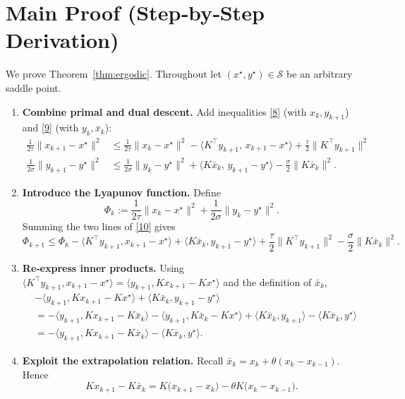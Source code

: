 \documentclass[11pt]{article}
\begin{document}
\section*{Main Proof (Step‑by‑Step Derivation)}
We prove Theorem~\ref{thm:ergodic}.  Throughout let $(x^{\star},y^{\star})\in\mathcal{S}$ be an arbitrary saddle point.

\begin{enumerate}[label=[Step \arabic*]]
\item \textbf{Combine primal and dual descent.}  
Add inequalities \eqref{8} (with $x_{k},y_{k+1}$) and \eqref{9} (with $y_{k},\bar{x}_{k}$):
\[
\begin{aligned}
\frac{1}{2\tau}\|x_{k+1}-x^{\star}\|^{2}
&\le \frac{1}{2\tau}\|x_{k}-x^{\star}\|^{2}
      -\langle K^{\top}y_{k+1},\,x_{k+1}-x^{\star}\rangle
      +\frac{\tau}{2}\|K^{\top}y_{k+1}\|^{2}\\[4pt]
\frac{1}{2\sigma}\|y_{k+1}-y^{\star}\|^{2}
&\le \frac{1}{2\sigma}\|y_{k}-y^{\star}\|^{2}
      +\langle K\bar{x}_{k},\,y_{k+1}-y^{\star}\rangle
      -\frac{\sigma}{2}\|K\bar{x}_{k}\|^{2}.
\end{aligned}
\tag{10}
\]

\item \textbf{Introduce the Lyapunov function.}  
Define
\[
\Phi_{k}:=\frac{1}{2\tau}\|x_{k}-x^{\star}\|^{2}
        +\frac{1}{2\sigma}\|y_{k}-y^{\star}\|^{2}.
\tag{11}
\]
Summing the two lines of \eqref{10} gives
\[
\Phi_{k+1}\le \Phi_{k}
   -\langle K^{\top}y_{k+1},x_{k+1}-x^{\star}\rangle
   +\langle K\bar{x}_{k},y_{k+1}-y^{\star}\rangle
   +\frac{\tau}{2}\|K^{\top}y_{k+1}\|^{2}
   -\frac{\sigma}{2}\|K\bar{x}_{k}\|^{2}.
\tag{12}
\]

\item \textbf{Re‑express inner products.}  
Using $\langle K^{\top}y_{k+1},x_{k+1}-x^{\star}\rangle
      =\langle y_{k+1},Kx_{k+1}-Kx^{\star}\rangle$ and the definition of $\bar{x}_{k}$,
\[
\begin{aligned}
&-\langle y_{k+1},Kx_{k+1}-Kx^{\star}\rangle
   +\langle K\bar{x}_{k},y_{k+1}-y^{\star}\rangle\\
&= -\langle y_{k+1},Kx_{k+1}-K\bar{x}_{k}\rangle
   -\langle y_{k+1},K\bar{x}_{k}-Kx^{\star}\rangle
   +\langle K\bar{x}_{k},y_{k+1}\rangle
   -\langle K\bar{x}_{k},y^{\star}\rangle\\
&= -\langle y_{k+1},Kx_{k+1}-K\bar{x}_{k}\rangle
   -\langle K\bar{x}_{k},y^{\star}\rangle .
\end{aligned}
\tag{13}
\]

\item \textbf{Exploit the extrapolation relation.}  
Recall $\bar{x}_{k}=x_{k}+ \theta (x_{k}-x_{k-1})$. Hence
\[
Kx_{k+1}-K\bar{x}_{k}=K\big(x_{k+1}-x_{k}\big)-\theta K\big(x_{k}-x_{k-1}\big).
\tag{14}
\]


\end{enumerate}
\end{document}
